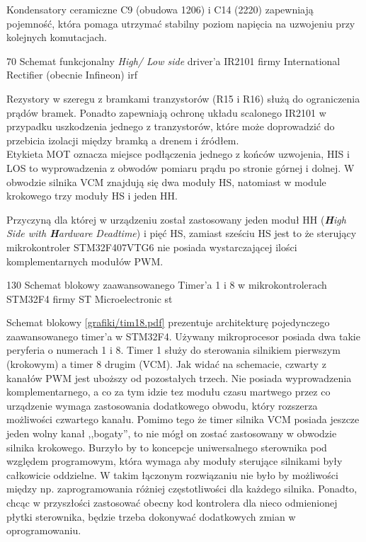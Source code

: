 Kondensatory ceramiczne C9 (obudowa 1206) i C14 (2220) zapewniają pojemność, która pomaga utrzymać stabilny poziom napięcia na uzwojeniu przy kolejnych komutacjach. 

	{70}
	{Schemat funkcjonalny {\it High/ Low side} driver'a IR2101 firmy International Rectifier (obecnie Infineon)}
	{irf}

Rezystory w szeregu z bramkami tranzystorów (R15 i R16) służą do ograniczenia prądów bramek. Ponadto zapewniają ochronę układu scalonego IR2101 w przypadku uszkodzenia jednego z tranzystorów, które może doprowadzić do przebicia izolacji między bramką a drenem i źródłem. \\

Etykieta MOT oznacza miejsce podłączenia jednego z końców uzwojenia, HIS i LOS to wyprowadzenia z obwodów pomiaru prądu po stronie górnej i dolnej. W obwodzie silnika VCM znajdują się dwa moduły HS, natomiast w module krokowego trzy moduły HS i jeden HH.


Przyczyną dla której w urządzeniu został zastosowany jeden moduł HH (\textit{\textbf{H}igh Side with \textbf{H}ardware Deadtime}) i pięć HS, zamiast sześciu HS jest to że sterujący mikrokontroler STM32F407VTG6 nie posiada wystarczającej ilości komplementarnych modułów PWM.

	{130}
	{Schemat blokowy zaawansowanego Timer'a 1 i 8 w mikrokontrolerach STM32F4 firmy ST Microelectronic}
	{st}

Schemat blokowy \ref{grafiki/tim18.pdf} prezentuje architekturę pojedynczego zaawansowanego timer'a w STM32F4. Używany mikroprocesor posiada dwa takie peryferia o numerach 1 i 8. Timer 1 służy do sterowania silnikiem pierwszym (krokowym) a timer 8 drugim (VCM). Jak widać na schemacie, czwarty z kanałów PWM jest uboższy od pozostałych trzech. Nie posiada wyprowadzenia komplementarnego, a co za tym idzie tez modułu czasu martwego przez co urządzenie wymaga zastosowania dodatkowego obwodu, który rozszerza możliwości czwartego kanału. Pomimo tego że timer silnika VCM posiada jeszcze jeden wolny kanał ,,bogaty'', to nie mógł on zostać zastosowany w obwodzie silnika krokowego. Burzyło by to koncepcje uniwersalnego sterownika pod względem programowym, która wymaga aby moduły sterujące silnikami były całkowicie oddzielne. W takim łączonym rozwiązaniu nie było by możliwości między np. zaprogramowania różniej częstotliwości dla każdego silnika. Ponadto, chcąc w przyszłości zastosować obecny kod kontrolera dla nieco odmienionej płytki sterownika, będzie trzeba dokonywać dodatkowych zmian w oprogramowaniu.

